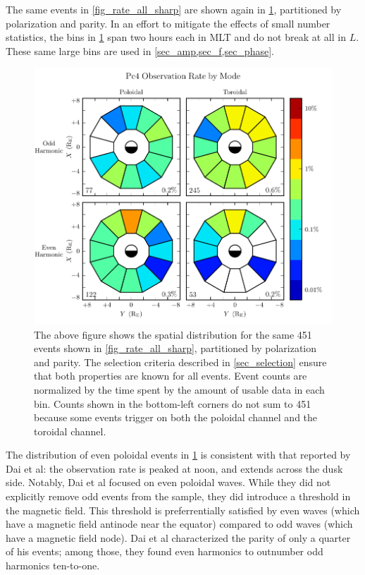 The same events in \cref{fig_rate_all_sharp} are shown again in
\cref{fig_mode_all}, partitioned by polarization and parity. In an effort to
mitigate the effects of small number statistics, the bins in
\cref{fig_mode_all} span two hours each in MLT and do not break at all in $L$. 
These same large bins are used in \cref{sec_amp,sec_f,sec_phase}. 

\begin{figure}[!htb]
  \centering
  \includegraphics[width=\textwidth]{figures/mode_all.pdf}
  \caption[Rate of Pc4 Events by Mode]{
    The above figure shows the spatial distribution for the same 451 events
    shown in \cref{fig_rate_all_sharp}, partitioned by polarization and parity.
    The selection criteria described in \cref{sec_selection} ensure that both
    properties are known for all events. Event counts are normalized by the
    time spent by the amount of usable data in each bin. Counts shown in the
    bottom-left corners do not sum to 451 because some events trigger on both
    the poloidal channel and the toroidal channel. 
  }
  \label{fig_mode_all}
\end{figure}

The distribution of even poloidal events in \cref{fig_mode_all} is
consistent with that reported by Dai et al\cite{dai_2015}: the observation rate
is peaked at noon, and extends across the dusk side. Notably, Dai et al focused
on even poloidal waves. While they did not explicitly remove odd events from
the sample, they did introduce a threshold in the magnetic field. This
threshold is
preferrentially satisfied by even waves (which have a magnetic field antinode
near the equator) compared to odd waves (which have a magnetic field node). 
Dai et al
characterized the parity of only a quarter of his events; among those, they
found even harmonics to outnumber odd harmonics ten-to-one. 

